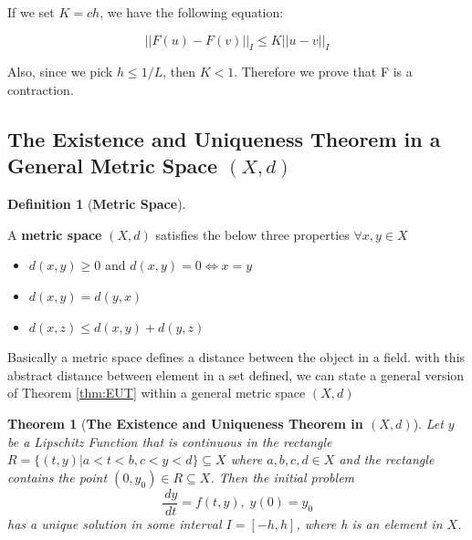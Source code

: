 \documentclass{article}
\newtheorem{theorem}{Theorem}[section]
\theoremstyle{definition}
\newtheorem{definition}{Definition}[section]
\theoremstyle{remark}
\begin{document}
If we set $K = ch$, we have the following equation:

\begin{equation}\label{eqn:contractionI}
    \lvert\lvert F(u) - F(v)\rvert\rvert_{I} \leq K \lvert\lvert u - v \rvert\rvert_{I}
\end{equation}

Also, since we pick $h \leq 1/L$, then $K < 1$. Therefore we prove that F is a contraction.

\subsection{The Existence and Uniqueness Theorem in a General Metric Space $(X,d)$}

\begin{definition}[\textbf{Metric Space}]\label{def:matricSpace}

A \textbf{metric space} $(X,d)$ satisfies the below three properties $\forall x,y \in X$ 
\begin{itemize}
    \item $d(x,y) \geq 0$ and $d(x,y) = 0 \Longleftrightarrow x = y$
    \item $d(x,y) = d(y,x)$
    \item $d(x,z) \leq d(x,y) + d(y,z)$
\end{itemize}

\end{definition}

Basically a metric space defines a distance between the object in a field. with this abstract distance between element in a set defined, we can state a general version of Theorem \ref{thm:EUT} within a general metric space $(X,d)$

\begin{theorem}[\textbf{The Existence and Uniqueness Theorem in $(X,d)$}]\label{thm:EUTXd}
    Let $y$ be a Lipschitz Function that is continuous in the rectangle $R = \{(t,y)|a < t < b, c < y < d\} \subseteq X$ where $a,b,c,d \in X$ and the rectangle contains the point $(0, y_0) \in R \subseteq X$. Then the initial problem
    \begin{equation}
        \dfrac{\,dy}{\,dt} = f(t,y),\; y(0) = y_0
    \end{equation}
has a unique solution in some interval $I = [-h, h]$, where h is an element in $X$.
\end{theorem}

\paragraph{  }
\end{document}
